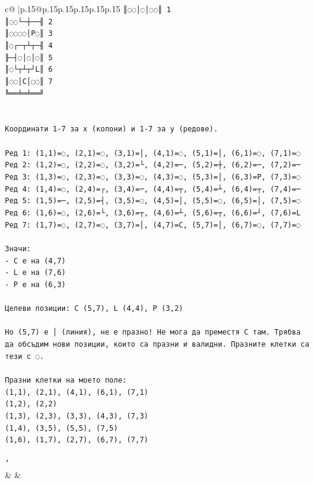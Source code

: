 \documentclass{article}
\begin{document}
{\begin{supertabular}{c@{$\;$}|p{.15\linewidth}@{}p{.15\linewidth}p{.15\linewidth}p{.15\linewidth}p{.15\linewidth}p{.15\linewidth}}
{{{\texttt{║◌◌│◌│◌◌║ 1} \\
\texttt{║◌◌└─┼──╢ 2} \\
\texttt{║◌◌◌◌│P◌║ 3} \\
\texttt{║◌┌─┬┴┬─╢ 4} \\
\texttt{╟─┤◌│◌│◌║ 5} \\
\texttt{║◌└┬┴┬┘L║ 6} \\
\texttt{║◌◌│C│◌◌║ 7} \\
\texttt{╚══╧═╧══╝} \\
\\ 
\\ 
\texttt{Координати 1{-}7 за x (колони) и 1{-}7 за y (редове).} \\
\\ 
\texttt{Ред 1: (1,1)=◌, (2,1)=◌, (3,1)=│, (4,1)=◌, (5,1)=│, (6,1)=◌, (7,1)=◌} \\
\texttt{Ред 2: (1,2)=◌, (2,2)=◌, (3,2)=└, (4,2)=─, (5,2)=┼, (6,2)=─, (7,2)=─} \\
\texttt{Ред 3: (1,3)=◌, (2,3)=◌, (3,3)=◌, (4,3)=◌, (5,3)=│, (6,3)=P, (7,3)=◌} \\
\texttt{Ред 4: (1,4)=◌, (2,4)=┌, (3,4)=─, (4,4)=┬, (5,4)=┴, (6,4)=┬, (7,4)=─} \\
\texttt{Ред 5: (1,5)=─, (2,5)=┤, (3,5)=◌, (4,5)=│, (5,5)=◌, (6,5)=│, (7,5)=◌} \\
\texttt{Ред 6: (1,6)=◌, (2,6)=└, (3,6)=┬, (4,6)=┴, (5,6)=┬, (6,6)=┘, (7,6)=L} \\
\texttt{Ред 7: (1,7)=◌, (2,7)=◌, (3,7)=│, (4,7)=C, (5,7)=│, (6,7)=◌, (7,7)=◌} \\
\\ 
\texttt{Значи:} \\
\texttt{{-} C е на (4,7)} \\
\texttt{{-} L е на (7,6)} \\
\texttt{{-} P е на (6,3)} \\
\\ 
\texttt{Целеви позиции: C (5,7), L (4,4), P (3,2)} \\
\\ 
\texttt{Но (5,7) е │ (линия), не е празно! Не мога да преместя C там. Трябва да обсъдим нови позиции, които са празни и валидни. Празните клетки са тези с ◌.} \\
\\ 
\texttt{Празни клетки на моето поле:} \\
\texttt{(1,1), (2,1), (4,1), (6,1), (7,1)} \\
\texttt{(1,2), (2,2)} \\
\texttt{(1,3), (2,3), (3,3), (4,3), (7,3)} \\
\texttt{(1,4), (3,5), (5,5), (7,5)} \\
\texttt{(1,6), (1,7), (2,7), (6,7), (7,7)} \\
\\ 
\texttt{'} \\
            }
        }
    }
    & & \\ \\


\end{supertabular}}
\end{document}
